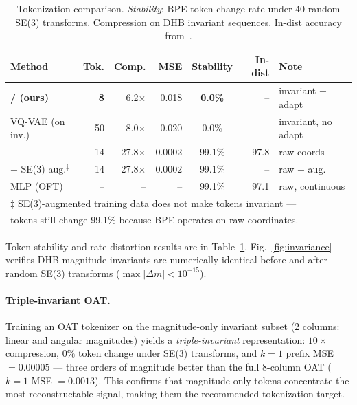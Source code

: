 \begin{table}[ht]
\centering
\small
\caption{Tokenization comparison. \textit{Stability}: BPE token change rate under 40 random SE(3)
transforms. Compression on DHB invariant sequences.
In-dist accuracy from~\cite{starvla_2026,openvla_oft_2025}.}
\label{tab:tokenization_combined}
\begin{tabular}{lrrrcrl}
\toprule
Method & Tok. & Comp. & MSE & Stability & In-dist & Note \\
\midrule
\textbf{\oat{}/\dhb{} (ours)} & \textbf{8} & 6.2$\times$ & 0.018 & \textbf{0.0\%} & -- & invariant + adapt \\
VQ-VAE (on inv.) & 50 & 8.0$\times$ & 0.020 & 0.0\% & -- & invariant, no adapt \\
\fast{}~\cite{fast2025} & 14 & 27.8$\times$ & 0.0002 & 99.1\% & 97.8 & raw coords \\
\fast{} + SE(3) aug.$^\ddag$ & 14 & 27.8$\times$ & 0.0002 & 99.1\% & -- & raw + aug. \\
MLP (OFT)           & -- & --  & -- & 99.1\%  & 97.1 & raw, continuous \\
\bottomrule
\multicolumn{7}{l}{\small $\ddag$ SE(3)-augmented training data does not make tokens invariant ---}\\
\multicolumn{7}{l}{\small \quad tokens still change 99.1\% because BPE operates on raw coordinates.}\\
\end{tabular}
\end{table}

Token stability and rate-distortion results are in Table~\ref{tab:tokenization_combined}.
Fig.~\ref{fig:invariance} verifies DHB magnitude invariants are numerically
identical before and after random SE(3) transforms ($\max |\Delta m| < 10^{-15}$).

\paragraph{Triple-invariant OAT.}
Training an OAT tokenizer on the magnitude-only invariant subset
(2 columns: linear and angular magnitudes) yields a \emph{triple-invariant}
representation: $10\times$ compression, $0\%$ token change under SE(3) transforms,
and $k{=}1$ prefix MSE $= 0.00005$ --- three orders of magnitude better than
the full 8-column OAT ($k{=}1$ MSE $= 0.0013$).
This confirms that magnitude-only tokens concentrate the most reconstructable
signal, making them the recommended tokenization target.

